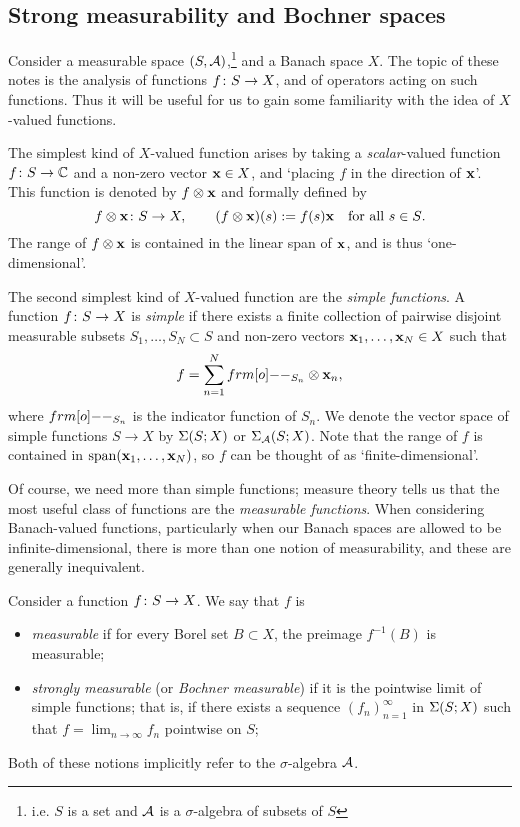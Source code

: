\subsection{Strong measurability and Bochner spaces}

Consider a measurable space $(S,\mathcal{A})$,\footnote{i.e. $S$ is a set and $\mathcal{A}$ is a $\sigma$-algebra of subsets of $S$} and a Banach space $X$.
The topic of these notes is the analysis of functions $f \colon S \rightarrow X$, and of operators acting on such functions.
Thus it will be useful for us to gain some familiarity with the idea of $X$-valued functions.

The simplest kind of $X$-valued function arises by taking a \emph{scalar}-valued function $f \colon S \rightarrow \mathbb{C}$ and a non-zero vector $\mathbf{x} \in X$, and `placing $f$ in the direction of $\mathbf{x}$'.
This function is denoted by $f \otimes \mathbf{x}$ and formally defined by
\begin{equation*}
  f \otimes \mathbf{x} \colon S \rightarrow X, \qquad (f \otimes \mathbf{x})(s) := f(s)\mathbf{x} \quad \text{for all $s \in S$.}
\end{equation*}
The range of $f \otimes \mathbf{x}$ is contained in the linear span of $\mathbf{x}$, and is thus `one-dimensional'.

The second simplest kind of $X$-valued function are the \emph{simple functions}.
A function $f \colon S \rightarrow X$ is \emph{simple} if there exists a finite collection of pairwise disjoint measurable subsets $S_1,\ldots,S_N \subset S$ and non-zero vectors $\mathbf{x}_1,\ldots,\mathbf{x}_N \in X$ such that
\begin{equation*}
  f = \sum_{n=1}^N \1_{S_n} \otimes \mb{x}_n ,
\end{equation*}
where $\1_{S_n}$ is the indicator function of $S_n$.
We denote the vector space of simple functions $S \to X$ by $\Sigma(S;X)$ or $\Sigma_{\mathcal{A}}(S;X)$.
Note that the range of $f$ is contained in $\mathrm{span}(\mathbf{x}_1,\ldots,\mathbf{x}_N)$, so $f$ can be thought of as `finite-dimensional'.

Of course, we need more than simple functions; measure theory tells us that the most useful class of functions are the \emph{measurable functions}.
When considering Banach-valued functions, particularly when our Banach spaces are allowed to be infinite-dimensional, there is more than one notion of measurability, and these are generally inequivalent.

\begin{defn}
  Consider a function $f \colon S \rightarrow X$.
  We say that $f$ is
  \begin{itemize}
  \item
    \emph{measurable} if for every Borel set $B \subset X$, the preimage $f^{-1}(B)$ is measurable;
  \item
    \emph{strongly measurable} (or \emph{Bochner measurable}) if it is the pointwise limit of simple functions; that is, if there exists a sequence $(f_n)_{n=1}^\infty$ in $\Sigma(S;X)$ such that $f = \lim_{n \to \infty} f_n$ pointwise on $S$;
  \end{itemize}
  Both of these notions implicitly refer to the $\sigma$-algebra $\mathcal{A}$.

  
\end{defn}

